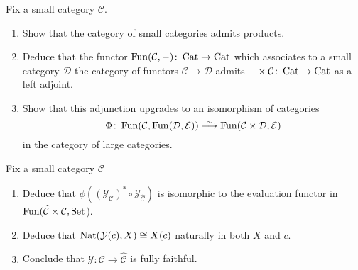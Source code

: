 \begin{Exercise}
	Fix a small category $ \mathcal{ C } $. 
	\begin{enumerate}[label=(\alph*)]
		\item 
		Show that the category of small categories admits products.
		
		\item 
		Deduce that the functor $ \operatorname{Fun} ( \mathcal{ C } , - ) \colon \operatorname{Cat} \to \operatorname{Cat} $ which associates to a small category $ \mathcal{ D } $ the category of functors $ \mathcal{ C } \to \mathcal{ D } $ admits $ - \times \mathcal{ C } \colon \operatorname{Cat} \to \operatorname{Cat} $ as a left adjoint.
		
		\item 
		Show that this adjunction upgrades to an isomorphism of categories 
		\[
		\Phi \colon \Fun ( \mathcal{ C } , \Fun ( \mathcal{ D } , \mathcal{ E } ) ) \isomorphism 
		\Fun ( \mathcal{ C } \times \mathcal{ D } , \mathcal{ E } )
		\]
		in the category of large categories.
	\end{enumerate}
\end{Exercise}

\begin{Exercise}
	Fix a small category $ \mathcal{ C } $
	\begin{enumerate}[label=(\alph*)]
		\item  
		Deduce that $ \phi (( \mathcal{ Y }_{ \mathcal{ C } } )^* \circ \mathcal{ Y }_{ \widehat{ \mathcal{ C } } } )$ is isomorphic to the evaluation functor in $ \operatorname{Fun} ( \widehat{ \mathcal{ C } } \times \mathcal{ C } , \operatorname{Set} $).
		
		\item 
		Deduce that $ \operatorname{Nat} ( \mathcal{ Y } ( c ) , X ) \cong X ( c ) $ naturally in both $ X $ and $ c $.
		
		\item 
		Conclude that $ \mathcal{ Y } \colon \mathcal{ C } \to \widehat{\mathcal{ C } }  $ is fully faithful.
	\end{enumerate}
\end{Exercise}

